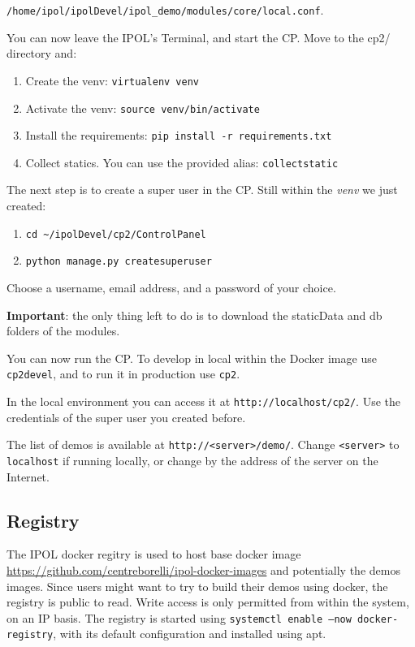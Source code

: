 \documentclass[a4paper,12pt]{article}
\begin{document}
{\tt /home/ipol/ipolDevel/ipol\_demo/modules/core/local.conf}.

You can now leave the IPOL's Terminal, and start the CP.
Move to the cp2/ directory and:

\begin{enumerate}
  \item Create the venv: {\tt virtualenv venv}
  \item Activate the venv: {\tt source venv/bin/activate}
  \item Install the requirements: {\tt pip install -r requirements.txt}
  \item Collect statics. You can use the provided alias: {\tt collectstatic}
\end{enumerate}

The next step is to create a super user in the CP. Still within the \emph{venv} we just created:
\begin{enumerate}
  \item {\tt cd \textasciitilde/ipolDevel/cp2/ControlPanel}
  \item {\tt python manage.py createsuperuser}
\end{enumerate}

Choose a username, email address, and a password of your choice.

\textbf{Important}: the only thing left to do is to download the staticData and db folders of the modules.

You can now run the CP. To develop in local within the Docker image use {\tt cp2devel}, and to run it in production use {\tt cp2}.

In the local environment you can access it at {\tt http://localhost/cp2/}. Use the credentials of the super user you created
before.

The list of demos is available at {\tt http://<server>/demo/}. Change {\tt <server>} to {\tt localhost} if running locally, or change by the address of the server on the Internet.

\subsection{Registry}
The IPOL docker regitry is used to host base docker image \url{https://github.com/centreborelli/ipol-docker-images} and potentially the demos images.
Since users might want to try to build their demos using docker, the registry is public to read. Write access is only permitted from within the system, on an IP basis.
The registry is started using {\tt systemctl enable --now docker-registry}, with its default configuration and installed using apt.
\end{document}
